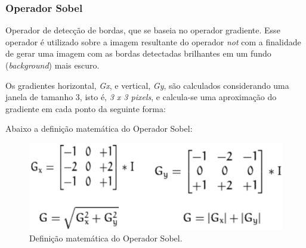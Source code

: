 \subsubsection{Operador Sobel}
Operador de detecção de bordas, que se baseia no operador gradiente. Esse operador é utilizado sobre a imagem resultante do operador \textit{not} com a finalidade de gerar uma imagem com as bordas detectadas brilhantes em um fundo (\textit{background}) mais escuro.

Os gradientes horizontal, \textit{Gx}, e vertical, \textit{Gy}, são calculados considerando uma janela de tamanho 3, isto é, \textit{3 x 3 pixels}, e calcula-se uma aproximação do gradiente em cada ponto da seguinte forma: \citep{sobel}

Abaixo a definição matemática do Operador Sobel:
	\begin{figure}[!htb]
       \begin{center}  
          \includegraphics[width=0.7\columnwidth]{img/definicao_matematica_sobel.jpg}
           \caption{\label{fig:definicao_matematica_sobel}Definição matemática do Operador Sobel.}
       \end{center}
   \end{figure} 



